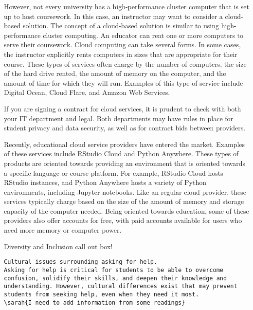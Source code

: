 However, not every university has a high-performance cluster computer that is set up to host coursework. 
In this case, an instructor may want to consider a cloud-based solution. 
The concept of a cloud-based solution is similar to using high-performance cluster computing.
An educator can rent one or more computers to serve their coursework. 
Cloud computing can take several forms. 
In some cases, the instructor explicitly rents computers in sizes that are appropriate for their course.
These types of services often charge by the number of computers, the size of the hard drive rented, the amount of memory on the computer, and the amount of time for which they will run.
Examples of this type of service include Digital Ocean, Cloud Flare, and Amazon Web Services.

{\begin{framed}
If you are signing a contract for cloud services, it is prudent to check with both your IT department and legal. 
Both departments may have rules in place for student privacy and data security, as well as for contract bids between providers.
\end{framed}}

Recently, educational cloud service providers have entered the market.
Examples of these services include RStudio Cloud and Python Anywhere. 
These types of products are oriented towards providing an environment that is oriented towards a specific language or course platform. 
For example, RStudio Cloud hosts RStudio instances, and Python Anywhere hosts a variety of Python environments, including Jupyter notebooks. 
Like an regular cloud provider, these services typically charge based on the size of the amount of memory and storage capacity of the computer needed.
Being oriented towards education, some of these providers also offer accounts for free, with paid accounts available for users who need more memory or computer power.






{\begin{framed}
Diversity and Inclusion call out box! 
\begin{snugshade*}
\begin{lstlisting}
Cultural issues surrounding asking for help.
Asking for help is critical for students to be able to overcome confusion, solidify their skills, and deepen their knowledge and understanding. However, cultural differences exist that may prevent students from seeking help, even when they need it most. 
\sarah{I need to add information from some readings}
\end{lstlisting}
\end{snugshade*}
\end{framed}}


